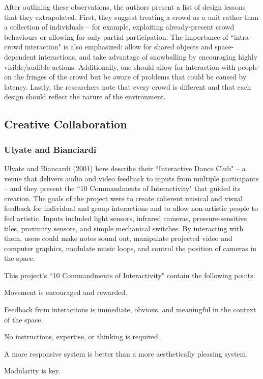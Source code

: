 After outlining these observations, the authors present a list of design lessons that they extrapolated. First, they suggest treating a crowd as a unit rather than a collection of individuals -- for example, exploiting already-present crowd behaviours or allowing for only partial participation. The importance of ``intra-crowd interaction" is also emphasized: allow for shared objects and space-dependent interactions, and take advantage of snowballing by encouraging highly visible/audible actions. Additionally, one should allow for interaction with people on the fringes of the crowd but be aware of problems that could be caused by latency. Lastly, the researchers note that every crowd is different and that each design should reflect the nature of the environment.

\subsection{Creative Collaboration}

\subsubsection{Ulyate and Bianciardi}

Ulyate and Biancardi (2001) here describe their ``Interactive Dance Club" -- a venue that delivers audio and video feedback to inputs from multiple participants -- and they present the ``10 Commandments of Interactivity" that guided its creation. The goals of the project were to create coherent musical and visual feedback for individual and group interactions and to allow non-artistic people to feel artistic. Inputs included light sensors, infrared cameras, pressure-sensitive tiles, proximity sensors, and simple mechanical switches. By interacting with them, users could make notes sound out, manipulate projected video and computer graphics, modulate music loops, and control the position of cameras in the space.

This project's ``10 Commandments of Interactivity" contain the following points:
\begin{itemize*}
	\item Movement is encouraged and rewarded.
	\item Feedback from interactions is immediate, obvious, and meaningful in the context of the space.
	\item No instructions, expertise, or thinking is required.
	\item A more responsive system is better than a more aesthetically pleasing system.
	\item Modularity is key.
\end{itemize*}

